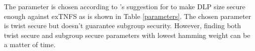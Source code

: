 The parameter is chosen according to \cite{sylvain_new_param}'s suggestion for to make DLP size secure enough against exTNFS \cite{C:KimBar16} as is shown in Table \ref{parameters}.
The  chosen parameter is twist secure but doesn't guarantee subgroup security.
However, finding both twist secure and subgroup secure parameters with lowest hamming weight can be a matter of time.
\renewcommand{\baselinestretch}{1.5}
\begin{table}[!h]
	\setlength\tabcolsep{3pt}
	\begin{center}		 
		\caption{Selected parameters for 128-bit security level according to  \cite{sylvain_new_param}}
		\label{parameters}
	\end{center}
\end{table}
\renewcommand{\baselinestretch}{1.0}


